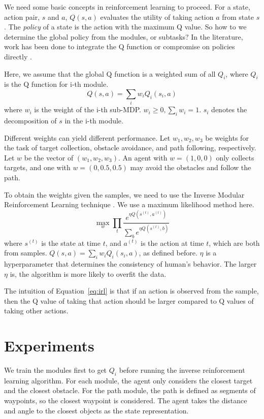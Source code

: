 \documentclass[11pt]{article} %
\begin{document}
We need some basic concepts in reinforcement learning to proceed. For a state, action
pair, $s$ and $a$, $Q(s, a)$ evaluates the utility of taking action $a$ from
state $s$. The {\em policy} of a state is the action with the maximum Q
value\cite{rl}. So how to we determine the global policy from the modules, or
subtasks? In the literature, work has been done to integrate the Q function
\cite{koller1999computing} or compromise on policies directly
\cite{thomas2012motor}.

Here, we assume that the global Q function is a weighted sum of all $Q_i$, where
$Q_i$ is the Q function for i-th module.
$$Q(s, a) = \sum_i w_i Q_i (s_i, a)$$
where $w_i$ is the weight of the i-th sub-MDP. $w_i \geq 0, \sum_i w_i = 1$.
$s_i$ denotes the decomposition of $s$ in the i-th module.

Different weights can yield different performance. Let $w_1, w_2, w_3$ be
weights for the task of target collection, obstacle avoidance, and path
following, respectively. Let $w$ be the vector of $(w_1, w_2, w_3)$. An agent
with $w = (1, 0, 0)$ only collects targets, and one with $w = (0, 0.5, 0.5)$ may
avoid the obstacles and follow the path.

To obtain the weights given the samples, we need to use the Inverse Modular
Reinforcement Learning technique \cite{rothkopf2013modular}. We use a maximum
likelihood method here.
\begin{equation}
\label{eq:irl}
\max_w \prod_t \frac{e^{\eta Q(s^{(t)}, a^{(t)})}}{\sum_b e^{\eta Q(s^{(t)}, b)}}
\end{equation}
where $s^{(t)}$ is the state at time $t$, and $a^{(t)}$ is the action at time
$t$, which are both from samples. $Q(s, a) = \sum_i w_i Q_i(s_i, a)$, as defined
before. $\eta$ is a hyperparameter that determines the consistency of human's
behavior. The larger $\eta$ is, the algorithm is more likely to overfit the data.

The intuition of Equation~\ref{eq:irl} is that if an action is observed from the
sample, then the Q value of taking that action should be larger compared to Q
values of taking other actions.

\section{Experiments}
\label{sec:exp}

We train the modules first to get $Q_i$ before running the inverse reinforcement
learning algorithm. For each module, the agent only considers the closest target
and the closest obstacle. For the path module, the path is defined as segments
of waypoints, so the closest waypoint is considered. The agent takes the
distance and angle to the closest objects as the state representation.
\end{document}
